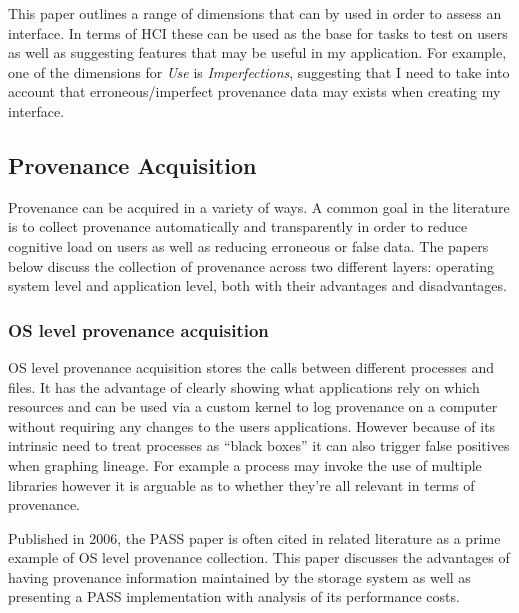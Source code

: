 This paper outlines a range of dimensions that can by used in order to assess an interface. In terms of HCI these can be used as the base for tasks to test on users as well as suggesting features that may be useful in my application. For example, one of the dimensions for \textit{Use} is \textit{Imperfections}, suggesting that I need to take into account that erroneous/imperfect provenance data may exists when creating my interface.

\subsection{Provenance Acquisition}
\label{sec:provenance_acquisition}

Provenance can be acquired in a variety of ways. A common goal in the literature is to collect provenance automatically and transparently in order to reduce cognitive load on users as well as reducing erroneous or false data. The papers below discuss the collection of provenance across two different layers: operating system level and application level, both with their advantages and disadvantages.

\subsubsection{OS level provenance acquisition}
\label{sub:os_level_provenance_acquisition}

OS level provenance acquisition stores the calls between different processes and files. It has the advantage of clearly showing what applications rely on which resources and can be used via a custom kernel to log provenance on a computer without requiring any changes to the users applications.
However because of its intrinsic need to treat processes as ``black boxes'' it can also trigger false positives when graphing lineage. For example a process may invoke the use of multiple libraries however it is arguable as to whether they're all relevant in terms of provenance.


Published in 2006, the PASS paper is often cited in related literature as a prime example of OS level provenance collection. This paper discusses the advantages of having provenance information maintained by the storage system as well as presenting a PASS implementation with analysis of its performance costs.

